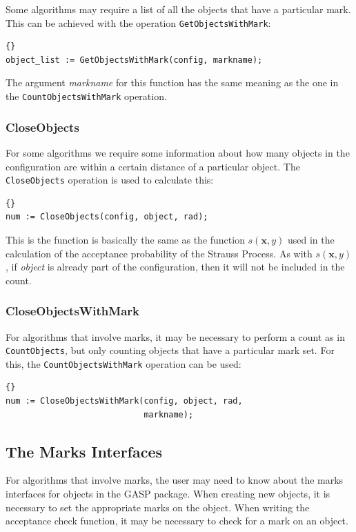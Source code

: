 Some algorithms may require a list of all the objects that have a
particular mark.  This can be achieved with the operation
\texttt{GetObjectsWithMark}:
\begin{lstlisting}{}
object_list := GetObjectsWithMark(config, markname);
\end{lstlisting}

\noindent The argument \emph{markname} for this function has the same
meaning as the one in the \texttt{CountObjectsWithMark} operation.

\subsubsection{CloseObjects}

For some algorithms we require some information about how many objects
in the configuration are within a certain distance of a particular
object.  The \texttt{CloseObjects} operation is used to calculate this:
\begin{lstlisting}{}
num := CloseObjects(config, object, rad);
\end{lstlisting}

\noindent This is the function is basically the same as the function
$s(\mathbf{x}, y)$ used in the calculation of the acceptance
probability of the Strauss Process.  As with $s(\mathbf{x}, y)$, if
\emph{object} is already part of the configuration, then it will not
be included in the count.

\subsubsection{CloseObjectsWithMark}

For algorithms that involve marks, it may be necessary to perform a
count as in \texttt{CountObjects}, but only counting objects that have
a particular mark set.  For this, the \texttt{CountObjectsWithMark}
operation can be used:

\begin{lstlisting}{}
num := CloseObjectsWithMark(config, object, rad,
                            markname);
\end{lstlisting}

\subsection{The Marks Interfaces}\label{sect:user-desc-marks}

For algorithms that involve marks, the user may need to know about the
marks interfaces for objects in the GASP package.  When creating new
objects, it is necessary to set the appropriate marks on the object.
When writing the acceptance check function, it may be necessary to
check for a mark on an object.

